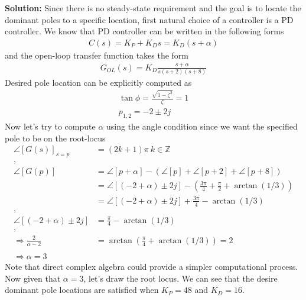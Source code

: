 \documentclass[twoside]{article}
\begin{document}
\vspace{12 pt}

\textbf{Solution:} Since there is no steady-state requirement 
and the goal is to locate the dominant poles to a specific location,
first natural choice of a controller is a PD controller. We know that 
PD controller can be written in the following forms
%
\begin{align*}
 C(s) = K_P + K_D s = K_D (s + \alpha)
\end{align*}
% 
and the open-loop transfer function takes the form
%
\begin{align*}
  G_{OL}(s) = K_D \frac{s + \alpha}{s (s+2) (s+8)}
\end{align*}
%
Desired pole location can be explicitly computed as
%
\begin{align*}
    \tan \phi = \frac{\sqrt{1 - \zeta^2}}{\zeta} = 1 \\
    p_{1,2} = -2 \pm 2 j 
\end{align*}
%
Now let's try to compute $\alpha$ using the angle condition
since we want the specified pole to be on the root-locus
%
\begin{align*}
  \angle [ G(s) ]_{s=p} &= (2 k + 1) \pi \ k \in \mathbb{Z}
\\
,
\\
  \angle [ G(p) ] &= \angle [ p + \alpha ] - \left( \angle [ p ] +
  \angle [ p + 2 ] + \angle [ p + 8 ] \right) 
\\
&= \angle [ (-2 + \alpha) \pm 2 j ]  - \left( \frac{3 \pi}{4} +
  \frac{\pi}{2} + \arctan (1/3) \right) 
\\
&= \angle [ (-2 + \alpha) \pm 2 j ]  + \frac{3 \pi}{4} - \arctan (1/3) 
\\
,
\\
\angle [ (-2 + \alpha) \pm 2 j ] &= \frac{\pi}{4} - \arctan (1/3)   
\\
,
\\
\Rightarrow \frac{2}{\alpha - 2} &= \arctan \left( \frac{\pi}{4} + \arctan
  (1/3) \right) = 2
\\
\\
\Rightarrow \alpha = 3
\end{align*}
%
Note that direct complex algebra could provide a simpler computational
process. Now given that $\alpha = 3$, let's draw the root locus.
We can see that the desire dominant pole locations are satisfied 
when $K_P = 48$ and $K_D = 16$. 
%
\vspace{3 pt}
\end{document}
